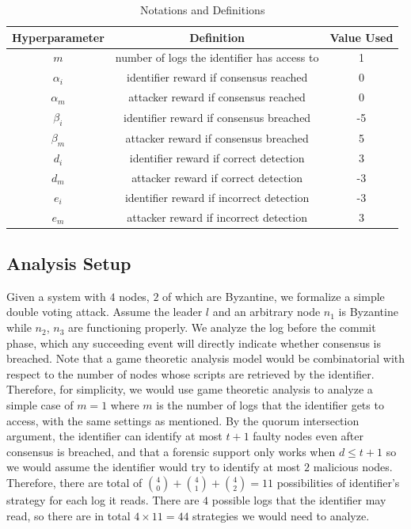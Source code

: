 \documentclass[a4paper,11pt]{article}
\begin{document}
\begin{table}[h!]
    \centering
     \begin{tabular}{||c c c||} 
     \hline
     Hyperparameter & Definition & Value Used \\ [0.5ex] 
     \hline\hline
     \(m\) & number of logs the identifier has access to & 1\\
     \(\alpha_i\) & identifier reward if consensus reached & 0  \\ 
     \(\alpha_m\) & attacker reward if consensus reached & 0 \\
     \(\beta_i\) & identifier reward if consensus breached & -5\\
     \(\beta_m\) & attacker reward if consensus breached & 5 \\
     \(d_i\) & identifier reward if correct detection & 3 \\ 
     \(d_m\) & attacker reward if correct detection & -3 \\ 
     \(e_i\) & identifier reward if incorrect detection & -3 \\ 
     \(e_m\) & attacker reward if incorrect detection & 3 \\ 
     [1ex] 
     \hline
     \end{tabular}
     \caption{Notations and Definitions}
     \label{tab:Notations}
\end{table}

\subsection{Analysis Setup}
Given a system with \(4\) nodes, \(2\) of which are Byzantine, we formalize a simple double voting attack. Assume the leader \(l\) and an arbitrary node \(n_1\) is Byzantine while \(n_2\), \(n_3\) are functioning properly. We analyze the log before the commit phase, which any succeeding event will directly indicate whether consensus is breached. Note that a game theoretic analysis model would be combinatorial with respect to the number of nodes whose scripts are retrieved by the identifier. Therefore, for simplicity, we would use game theoretic analysis to analyze a simple case of \(m = 1\) where \(m\) is the number of logs that the identifier gets to access, with the same settings as mentioned. By the quorum intersection argument, the identifier can identify at most \(t + 1\) faulty nodes even after consensus is breached, and that a forensic support only works when \(d \leq t + 1\) so we would assume the identifier would try to identify at most \(2\) malicious nodes.
Therefore, there are total of \(\binom{4}{0} + \binom{4}{1} + \binom{4}{2}= 11\) possibilities of identifier's strategy for each log it reads. There are \(4\) possible logs that the identifier may read, so there are in total \(4 \times 11 = 44\) strategies we would need to analyze.
\end{document}
